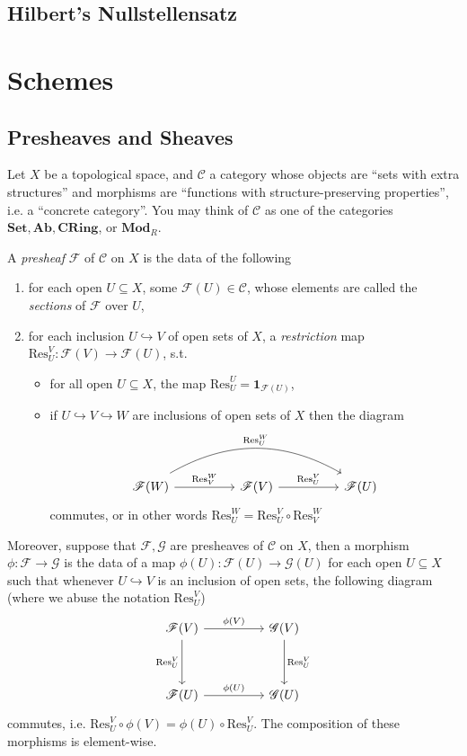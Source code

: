 \documentclass[11pt]{book}
\begin{document}
\section{Hilbert's Nullstellensatz}

\chapter{Schemes}
\section{Presheaves and Sheaves}
Let $X$ be a topological space, and $\mathcal C$ a category whose objects are ``sets with extra structures'' and morphisms are ``functions with structure-preserving properties'', i.e. a ``concrete category''. You may think of $\mathcal C$ as one of the categories $\mathbf{Set},\mathbf{Ab},\mathbf{CRing}$, or $\mathbf {Mod}_R$.
\begin{definition}\label{def:presheaf}A \textit{presheaf} $\mathscr{F}$ of $\mathcal C$ on $X$ is the data of the following
\begin{enumerate}[label=(\roman*)]
	\item for each open $U\subseteq X$, some $\mathscr{F}(U)\in \mathcal C$, whose elements are called the \textit{sections} of $\mathscr{F}$ over $U$,
	\item for each inclusion $U\hookrightarrow V$ of open sets of $X$, a \textit{restriction} map $\mathrm{Res}^V_U:\mathscr{F}(V)\rightarrow\mathscr{F}(U)$, s.t.
	\begin{itemize}
		\item for all open $U\subseteq X$, the map $\mathrm{Res}^U_U=\mathbf 1_{\mathscr{F}(U)}$,
		\item if $U\hookrightarrow V \hookrightarrow W$ are inclusions of open sets of $X$ then the diagram
		\[
		\begin{tikzcd}[sep=huge]
			\mathscr{F}(W) \arrow[r,"\mathrm{Res}^W_V"] \arrow[rr, "\mathrm{Res}^W_U", bend left, shift left=1] & \mathscr{F}(V) \arrow[r,"\mathrm{Res}^V_U"] & \mathscr{F}(U)
		\end{tikzcd}
		\]
		commutes, or in other words $\mathrm{Res}^W_U=\mathrm{Res}^V_U\circ \mathrm{Res}^W_V$
	\end{itemize}
\end{enumerate}
Moreover, suppose that $\mathscr{F},\mathscr{G}$ are presheaves of $\mathcal C$ on $X$, then a morphism $\phi:\mathscr{F}\rightarrow\mathscr{G}$ is the data of a map $\phi(U):\mathscr{F}(U)\rightarrow\mathscr{G}(U)$ for each open $U\subseteq X$ such that whenever $U\hookrightarrow V$ is an inclusion of open sets, the following diagram (where we abuse the notation $\mathrm{Res}^V_U$)
\[
\begin{tikzcd}[sep = huge]
\mathscr{F}(V) \arrow[r, "\phi(V)"] \arrow[d, "\mathrm{Res}^V_U"'] & \mathscr{G}(V) \arrow[d, "\mathrm{Res}^V_U"] \\
\mathscr{F}(U) \arrow[r, "\phi(U)"]                 & \mathscr{G}(U)               
\end{tikzcd}\]
commutes, i.e. $\mathrm{Res}^V_U\circ\phi(V)=\phi(U)\circ\mathrm{Res}^V_U$. The composition of these morphisms is element-wise.
\end{definition}
\end{document}
